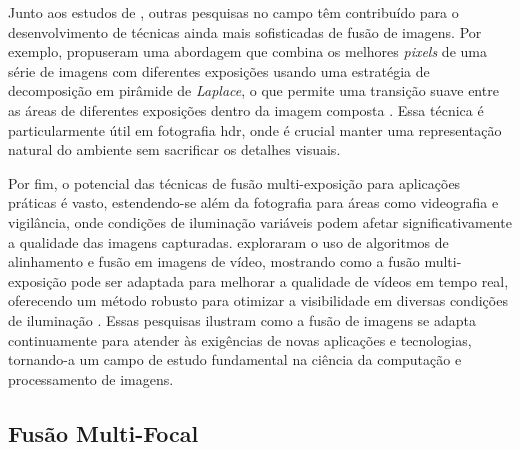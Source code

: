 Junto aos estudos de , outras pesquisas no campo têm contribuído para o desenvolvimento de técnicas ainda mais sofisticadas de fusão de imagens. Por exemplo,  propuseram uma abordagem que combina os melhores \textit{pixels} de uma série de imagens com diferentes exposições usando uma estratégia de decomposição em pirâmide de \textit{Laplace}, o que permite uma transição suave entre as áreas de diferentes exposições dentro da imagem composta \cite{Mertens2007}. Essa técnica é particularmente útil em fotografia \gls{hdr}, onde é crucial manter uma representação natural do ambiente sem sacrificar os detalhes visuais.

Por fim, o potencial das técnicas de fusão multi-exposição para aplicações práticas é vasto, estendendo-se além da fotografia para áreas como videografia e vigilância, onde condições de iluminação variáveis podem afetar significativamente a qualidade das imagens capturadas.  exploraram o uso de algoritmos de alinhamento e fusão em imagens de vídeo, mostrando como a fusão multi-exposição pode ser adaptada para melhorar a qualidade de vídeos em tempo real, oferecendo um método robusto para otimizar a visibilidade em diversas condições de iluminação \cite{Goshtasby2007}. Essas pesquisas ilustram como a fusão de imagens se adapta continuamente para atender às exigências de novas aplicações e tecnologias, tornando-a um campo de estudo fundamental na ciência da computação e processamento de imagens.


 \subsection{Fusão Multi-Focal}\label{subsec:multifocal}


